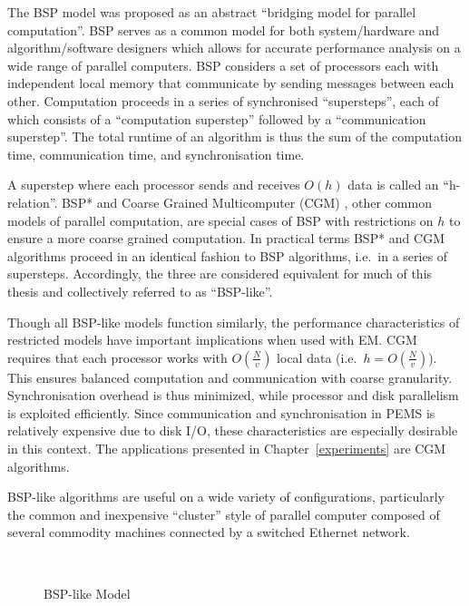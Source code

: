 \documentclass[12pt]{carletoncsthesis}
\begin{document}
The BSP model \cite{bsp} was proposed as an abstract ``bridging model for
parallel computation''.  BSP serves as a common model for both system/hardware
and algorithm/software designers which allows for accurate performance analysis
on a wide range of parallel computers.  BSP considers a set of processors
each with independent local memory that communicate by sending messages
between each other.  Computation proceeds in a series of synchronised
``supersteps'', each of which consists of a ``computation superstep'' followed
by a ``communication superstep''.  The total runtime of an algorithm is thus
the sum of the computation time, communication time, and synchronisation time.

A superstep where each processor sends and receives $O(h)$ data is called an
``h-relation''.  BSP* \cite{bsp*} and Coarse Grained Multicomputer (CGM)
\cite{cgm}, other common models of parallel computation, are special cases
of BSP with restrictions on $h$ to ensure a more coarse grained computation.
In practical terms BSP* and CGM algorithms proceed in an identical fashion
to BSP algorithms, i.e.\ in a series of supersteps.  Accordingly, the three
are considered equivalent for much of this thesis and collectively referred
to as ``BSP-like''.

Though all BSP-like models function similarly, the performance characteristics
of restricted models have important implications when used with EM.
CGM requires that each processor works with $O(\frac{N}{v})$ local data
(i.e.\ $h = O(\frac{N}{v})$).  This ensures balanced computation and
communication with coarse granularity.  Synchronisation overhead is thus
minimized, while processor and disk parallelism is exploited efficiently.
Since communication and synchronisation in PEMS is relatively expensive due
to disk I/O, these characteristics are especially desirable in this context.
The applications presented in Chapter~\ref{experiments} are CGM algorithms.

BSP-like algorithms are useful on a wide variety of configurations,
particularly the common and inexpensive ``cluster'' style of parallel
computer composed of several commodity machines connected by a switched
Ethernet network.

\begin{figure}[h]
\begin{center}
	 \\
\end{center}
\caption{BSP-like Model}
\label{bsp_model}
\end{figure}
\end{document}
